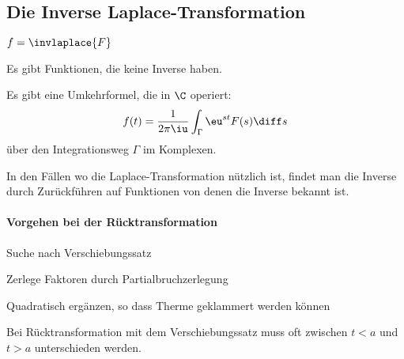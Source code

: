 	\subsection{Die Inverse Laplace-Transformation} %
		\begin{notation}
			$
				f = \invlaplace{F}
			$
		\end{notation}

		\begin{bemerkungen}
			\item Es gibt Funktionen, die keine Inverse haben.
			\item Es gibt eine Umkehrformel, die in $\C$ operiert:\[
				f(t) = \frac{1}{2\pi\iu} \int_\Gamma \eu^{st} F(s) \diff s
			\] über den Integrationsweg $\Gamma$ im Komplexen.
			\item In den Fällen wo die Laplace-Transformation nützlich ist, findet
			man die Inverse durch Zurückführen auf Funktionen von denen die Inverse
			bekannt ist.
		\end{bemerkungen}
		
		\paragraph{Vorgehen bei der Rücktransformation} %
			\begin{tightitemize}
				\item Suche nach Verschiebungssatz
				\item Zerlege Faktoren durch Partialbruchzerlegung
				\item Quadratisch ergänzen, so dass Therme geklammert werden können
				\item Bei Rücktransformation mit dem Verschiebungssatz muss oft zwischen $t<a$ und $t>a$ unterschieden werden.
			\end{tightitemize}

